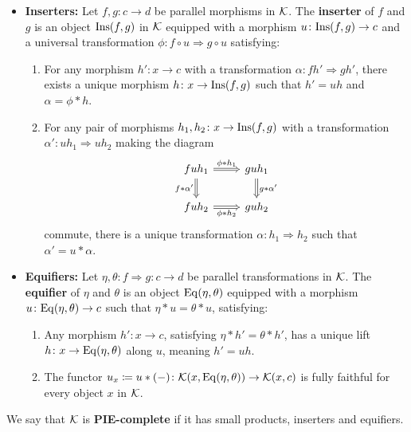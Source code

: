 \begin{definition}
\begin{itemize}
       \item \textbf{Inserters:} Let $f,g\colon c\to d$ be parallel morphisms in $\mathcal{K}$. The \textbf{inserter} of $f$ and $g$ is an object $\mathrm{Ins}(f,g)$ in $\mathcal{K}$ equipped with a morphism $u\colon\mathrm{Ins}(f,g) \to c$ and a universal transformation $\phi \colon f \circ u \Rightarrow g \circ u$ satisfying:
       \begin{enumerate}[label=(\roman*)]
           \item For any morphism $h'\colon x\to c$ with a transformation $\alpha\colon fh'\Rightarrow gh'$, there exists a unique morphism $h\colon x\to \mathrm{Ins}(f,g)$ such that $h' = uh$ and $\alpha = \phi*h$.
           \item For any pair of morphisms $h_1,h_2\colon x\to \mathrm{Ins}(f,g)$ with a transformation $\alpha'\colon uh_1\Rightarrow uh_2$ making the diagram
           \begin{equation}\label{cd:2ndUnivInserter}
           \begin{tikzcd}
fuh_1 \arrow[d, "f*\alpha'"', Rightarrow] \arrow[r, "\phi*h_1", Rightarrow] & guh_1 \arrow[d, "g*\alpha'", Rightarrow] \\
fuh_2 \arrow[r, "\phi*h_2"', Rightarrow]                                   & guh_2
\end{tikzcd}
           \end{equation}
           commute, there is a unique transformation $\alpha\colon h_1\Rightarrow h_2$ such that $\alpha' = u*\alpha$.
       \end{enumerate}

       \item \textbf{Equifiers:} Let $\eta, \theta \colon f\Rightarrow g\colon c\to d$ be parallel transformations in $\mathcal{K}$. The \textbf{equifier} of $\eta$ and $\theta$ is an object $\mathrm{Eq}(\eta, \theta)$ equipped with a morphism $u \colon \mathrm{Eq}(\eta, \theta) \to c$ such that $\eta * u = \theta * u$, satisfying:
       \begin{enumerate}[label=(\roman*)]
           \item Any morphism $h'\colon x\to c$, satisfying $\eta*h' = \theta*h'$, has a unique lift $h\colon x\to \mathrm{Eq}(\eta,\theta)$ along $u$, meaning $h' = uh$.
           \item The functor $u_x\coloneqq u*(-)\colon \mathcal{K}(x,\mathrm{Eq}(\eta,\theta))\to \mathcal{K}(x,c)$ is fully faithful for every object $x$ in $\mathcal{K}$.
       \end{enumerate}
   \end{itemize}
   We say that $\mathcal{K}$ is \textbf{PIE-complete} if it has small products, inserters and equifiers.
\end{definition}


